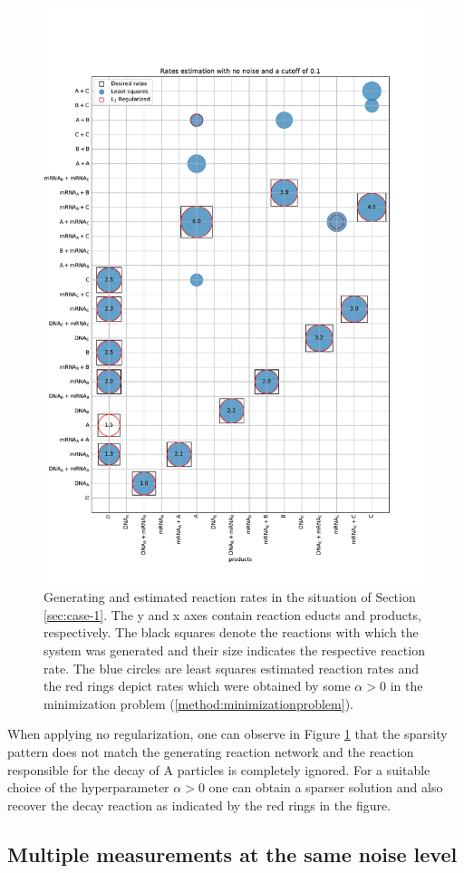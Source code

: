 \documentclass[oneside, abstracton, titlepage]{scrartcl}
\begin{document}
	\begin{figure}
		\centering
		\includegraphics[width=.7\textwidth]{./figures_tex/bubbles}
		\caption{Generating and estimated reaction rates in the situation of Section \ref{sec:case-1}. The y and x axes contain reaction educts and products, respectively. The black squares denote the reactions with which the system was generated and their size indicates the respective reaction rate. The blue circles are least squares estimated reaction rates and the red rings depict rates which were obtained by some $\alpha>0$ in the minimization problem (\ref{method:minimizationproblem}).}
		\label{fig:case-1-sparsity-pattern}
	\end{figure}

	When applying no regularization, one can observe in Figure \ref{fig:case-1-sparsity-pattern} that the sparsity pattern does not match the generating reaction network and the reaction responsible for the decay of $\mathrm{A}$ particles is completely ignored. For a suitable choice of the hyperparameter $\alpha > 0$ one can obtain a sparser solution and also recover the decay reaction as indicated by the red rings in the figure.
	
	\subsection{Multiple measurements at the same noise level}\label{sec:case-2}
\end{document}
